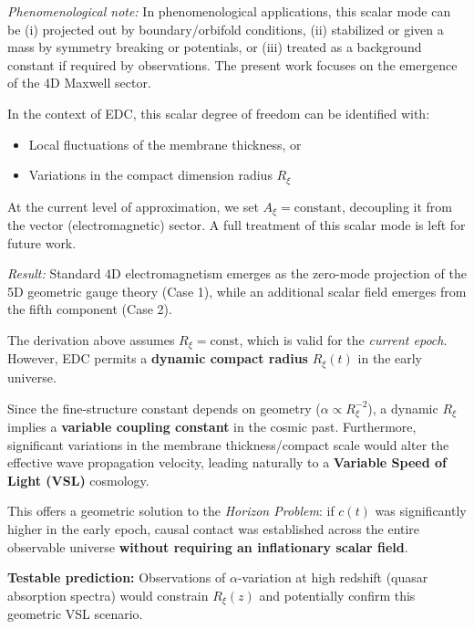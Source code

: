 \noindent\textit{Phenomenological note:} In phenomenological applications, this scalar mode can be (i) projected out by boundary/orbifold conditions, (ii) stabilized or given a mass by symmetry breaking or potentials, or (iii) treated as a background constant if required by observations. The present work focuses on the emergence of the 4D Maxwell sector.

\begin{tcolorbox}[colback=blue!5,colframe=blue!60!black,title=Physical Interpretation of $A_\xi$ in EDC]
In the context of EDC, this scalar degree of freedom can be identified with:
\begin{itemize}
    \item Local fluctuations of the membrane thickness, or
    \item Variations in the compact dimension radius $R_\xi$
\end{itemize}
At the current level of approximation, we set $A_\xi = \text{constant}$, decoupling it from the vector (electromagnetic) sector. A full treatment of this scalar mode is left for future work.
\end{tcolorbox}

\textit{Result:} Standard 4D electromagnetism emerges as the zero-mode projection of the 5D geometric gauge theory (Case 1), while an additional scalar field emerges from the fifth component (Case 2).

\begin{tcolorbox}[colback=yellow!10,colframe=orange!70!black,title=\textbf{Cosmological Hypothesis: Dynamic $R_\xi$ and Variable Speed of Light}]
The derivation above assumes $R_\xi = \text{const}$, which is valid for the \textit{current epoch}. However, EDC permits a \textbf{dynamic compact radius} $R_\xi(t)$ in the early universe.

Since the fine-structure constant depends on geometry ($\alpha \propto R_\xi^{-2}$), a dynamic $R_\xi$ implies a \textbf{variable coupling constant} in the cosmic past. Furthermore, significant variations in the membrane thickness/compact scale would alter the effective wave propagation velocity, leading naturally to a \textbf{Variable Speed of Light (VSL)} cosmology.

This offers a geometric solution to the \textit{Horizon Problem}: if $c(t)$ was significantly higher in the early epoch, causal contact was established across the entire observable universe \textbf{without requiring an inflationary scalar field}.

\vspace{0.5em}

\textbf{Testable prediction:} Observations of $\alpha$-variation at high redshift (quasar absorption spectra) would constrain $R_\xi(z)$ and potentially confirm this geometric VSL scenario.
\end{tcolorbox}

